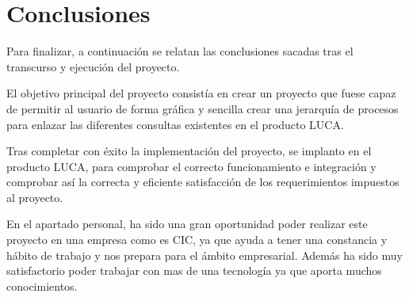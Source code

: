 	\chapter{Conclusiones}
	
	Para finalizar, a continuación se relatan las conclusiones sacadas tras el transcurso y ejecución del proyecto.
	
	\vspace{5mm}
	
	El objetivo principal del proyecto consistía en crear un proyecto que fuese capaz de permitir al usuario de forma gráfica y sencilla crear una jerarquía de procesos para enlazar las diferentes consultas existentes en el producto LUCA. 
	
	\vspace{5mm}
	
	Tras completar con éxito la implementación del proyecto, se implanto en el producto LUCA, para comprobar el correcto funcionamiento e integración y comprobar así la correcta y eficiente satisfacción de los requerimientos impuestos al proyecto.
	
	\vspace{5mm}
	
	En el apartado personal, ha sido una gran oportunidad poder realizar este proyecto en una empresa como es CIC, ya que ayuda a tener una constancia y hábito de trabajo y nos prepara para el ámbito empresarial. Además ha sido muy satisfactorio poder trabajar con mas de una tecnología ya que aporta muchos conocimientos.


	
